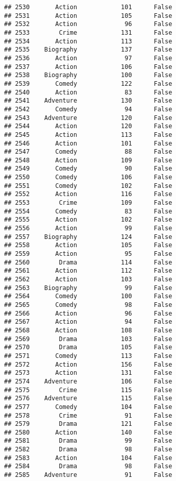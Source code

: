 \documentclass[
]{article}
\begin{document}
\begin{verbatim}
## 2530       Action            101      False
## 2531       Action            105      False
## 2532       Action             96      False
## 2533        Crime            131      False
## 2534       Action            113      False
## 2535    Biography            137      False
## 2536       Action             97      False
## 2537       Action            106      False
## 2538    Biography            100      False
## 2539       Comedy            122      False
## 2540       Action             83      False
## 2541    Adventure            130      False
## 2542       Comedy             94      False
## 2543    Adventure            120      False
## 2544       Action            120      False
## 2545       Action            113      False
## 2546       Action            101      False
## 2547       Comedy             88      False
## 2548       Action            109      False
## 2549       Comedy             90      False
## 2550       Comedy            106      False
## 2551       Comedy            102      False
## 2552       Action            116      False
## 2553        Crime            109      False
## 2554       Comedy             83      False
## 2555       Action            102      False
## 2556       Action             99      False
## 2557    Biography            124      False
## 2558       Action            105      False
## 2559       Action             95      False
## 2560        Drama            114      False
## 2561       Action            112      False
## 2562       Action            103      False
## 2563    Biography             99      False
## 2564       Comedy            100      False
## 2565       Comedy             98      False
## 2566       Action             96      False
## 2567       Action             94      False
## 2568       Action            108      False
## 2569        Drama            103      False
## 2570        Drama            105      False
## 2571       Comedy            113      False
## 2572       Action            156      False
## 2573       Action            131      False
## 2574    Adventure            106      False
## 2575        Crime            115      False
## 2576    Adventure            115      False
## 2577       Comedy            104      False
## 2578        Crime             91      False
## 2579        Drama            121      False
## 2580       Action            140      False
## 2581        Drama             99      False
## 2582        Drama             98      False
## 2583       Action            104      False
## 2584        Drama             98      False
## 2585    Adventure             91      False

\end{verbatim}
\end{document}
